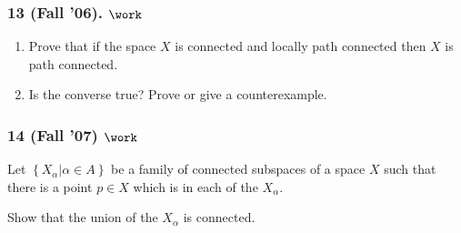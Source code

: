 \hypertarget{fall-06.-work}{%
\subsubsection{\texorpdfstring{13 (Fall '06).
\(\work\)}{13 (Fall '06). \textbackslash work}}\label{fall-06.-work}}

\begin{problem}[Fall 2006, 13]

\envlist

\begin{enumerate}
\def\labelenumi{\alph{enumi}.}
\item
  Prove that if the space \(X\) is connected and locally path connected
  then \(X\) is path connected.
\item
  Is the converse true? Prove or give a counterexample.
\end{enumerate}

\end{problem}

\hypertarget{fall-07-work}{%
\subsubsection{\texorpdfstring{14 (Fall '07)
\(\work\)}{14 (Fall '07) \textbackslash work}}\label{fall-07-work}}

\begin{problem}[?]

Let \(\left\{{X_\alpha \mathrel{\Big|}\alpha \in A}\right\}\) be a
family of connected subspaces of a space \(X\) such that there is a
point \(p \in X\) which is in each of the \(X_\alpha\).

Show that the union of the \(X_\alpha\) is connected.

\end{problem}


